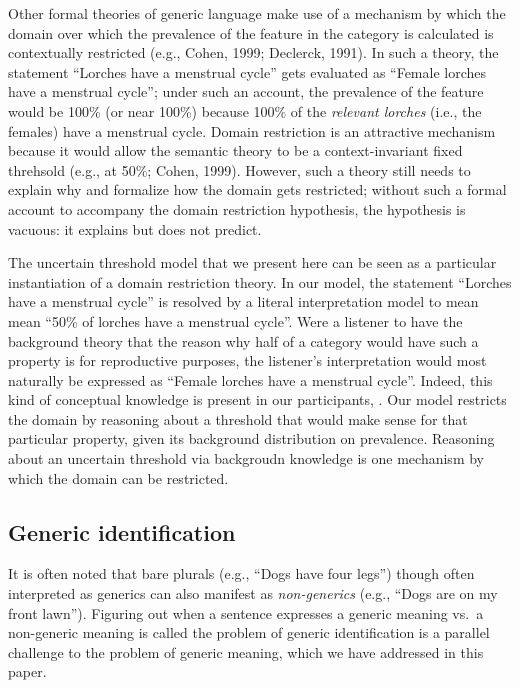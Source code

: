 \documentclass[floatsintext,doc]{apa6}
\theoremstyle{definition}
\theoremstyle{definition}
\theoremstyle{definition}
\theoremstyle{remark}
\begin{document}
Other formal theories of generic language make use of a mechanism by
which the domain over which the prevalence of the feature in the
category is calculated is contextually restricted (e.g., Cohen, 1999;
Declerck, 1991). In such a theory, the statement \enquote{Lorches have a
menstrual cycle} gets evaluated as \enquote{Female lorches have a
menstrual cycle}; under such an account, the prevalence of the feature
would be 100\% (or near 100\%) because 100\% of the \emph{relevant
lorches} (i.e., the females) have a menstrual cycle. Domain restriction
is an attractive mechanism because it would allow the semantic theory to
be a context-invariant fixed threhsold (e.g., at 50\%; Cohen, 1999).
However, such a theory still needs to explain why and formalize how the
domain gets restricted; without such a formal account to accompany the
domain restriction hypothesis, the hypothesis is vacuous: it explains
but does not predict.

The uncertain threshold model that we present here can be seen as a
particular instantiation of a domain restriction theory. In our model,
the statement \enquote{Lorches have a menstrual cycle} is resolved by a
literal interpretation model to mean mean \enquote{50\% of lorches have
a menstrual cycle}. Were a listener to have the background theory that
the reason why half of a category would have such a property is for
reproductive purposes, the listener's interpretation would most
naturally be expressed as \enquote{Female lorches have a menstrual
cycle}. Indeed, this kind of conceptual knowledge is present in our
participants, . Our model
restricts the domain by reasoning about a threshold that would make
sense for that particular property, given its background distribution on
prevalence. Reasoning about an uncertain threshold via backgroudn
knowledge is one mechanism by which the domain can be restricted.

\subsection{Generic identification}\label{generic-identification}

It is often noted that bare plurals (e.g., \enquote{Dogs have four
legs}) though often interpreted as generics can also manifest as
\emph{non-generics} (e.g., \enquote{Dogs are on my front lawn}).
Figuring out when a sentence expresses a generic meaning vs.~a
non-generic meaning is called the problem of generic identification is a
parallel challenge to the problem of generic meaning, which we have
addressed in this paper.
\end{document}
